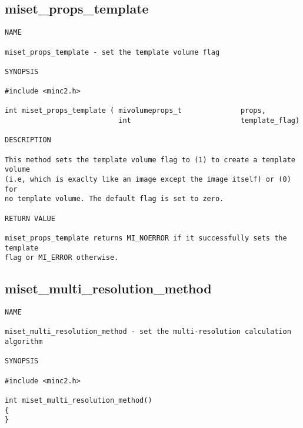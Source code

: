 \documentclass{article}
\begin{document}
\subsection{miset\_props\_template}
\begin{verbatim}
NAME

miset_props_template - set the template volume flag

SYNOPSIS

#include <minc2.h>

int miset_props_template ( mivolumeprops_t              props,
                           int                          template_flag)          

DESCRIPTION

This method sets the template volume flag to (1) to create a template volume
(i.e, which is exaclty like an image except the image itself) or (0) for
no template volume. The default flag is set to zero.

RETURN VALUE

miset_props_template returns MI_NOERROR if it successfully sets the template
flag or MI_ERROR otherwise.
\end{verbatim}

\subsection{miset\_multi\_resolution\_method}
\begin{verbatim}
NAME

miset_multi_resolution_method - set the multi-resolution calculation algorithm

SYNOPSIS

#include <minc2.h>

int miset_multi_resolution_method()
{
}

\end{verbatim}
\end{document}
